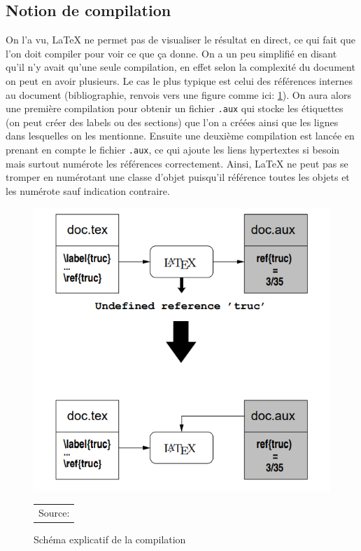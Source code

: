 \documentclass[a4paper, 11pt]{article}\usepackage[]{graphicx}\usepackage[]{xcolor}
\begin{document}
\subsection{Notion de compilation}
On l'a vu, \LaTeX{} ne permet pas de visualiser le résultat en direct, ce qui fait que l'on doit compiler pour voir ce que ça donne. On a un peu simplifié en disant qu'il n'y avait qu'une seule compilation, en effet selon la complexité du document on peut en avoir plusieurs. Le cas le plus typique est celui des références internes au document (bibliographie, renvois vers une figure comme ici: \ref{compilation}). On aura alors une première compilation pour obtenir un fichier \texttt{.aux} qui stocke les étiquettes (on peut créer des labels ou des sections) que l'on a créées ainsi que les lignes dans lesquelles on les mentionne. Ensuite une deuxième compilation est lancée en prenant en compte le fichier \texttt{.aux}, ce qui ajoute les liens hypertextes si besoin mais surtout numérote les références correctement. Ainsi, \LaTeX{} ne peut pas se tromper en numérotant une classe d'objet puisqu'il référence toutes les objets et les numérote sauf indication contraire.


\begin{figure}[h!]
  \caption{Schéma explicatif de la compilation}
  \label{compilation}
  \centering
  \includegraphics[scale=0.6]{Images/compilation.png}
  \begin{tabular}{p{\textwidth}}
  Source: \cite{Lozano2008}
  \end{tabular}
\end{figure}
\end{document}
